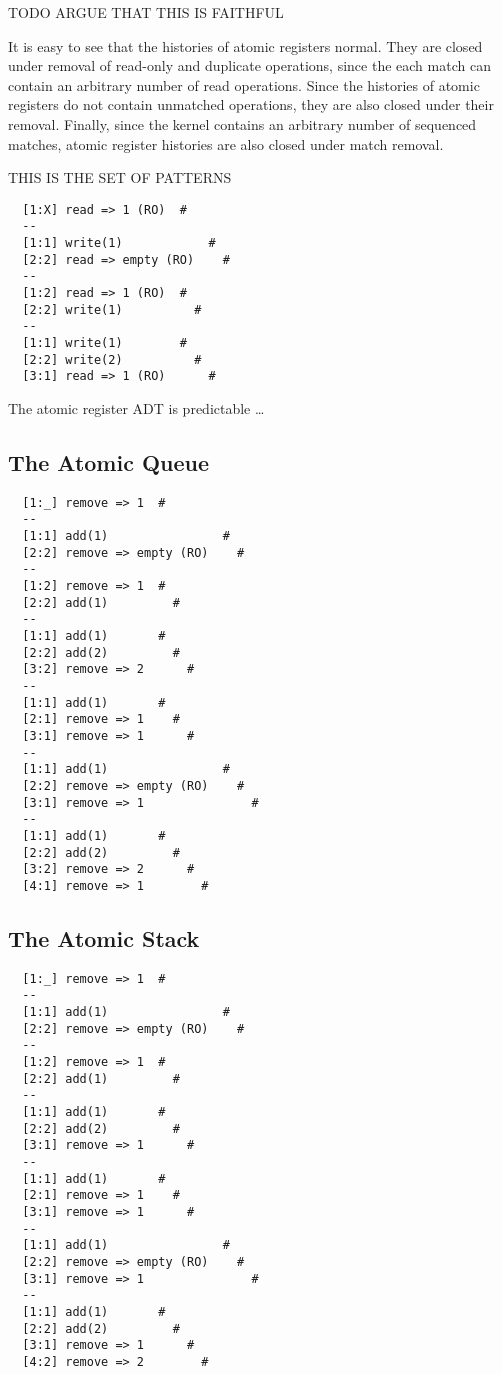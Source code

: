TODO ARGUE THAT THIS IS FAITHFUL

It is easy to see that the histories of atomic registers normal. They are
closed under removal of read-only and duplicate operations, since the each
match can contain an arbitrary number of read operations. Since the histories
of atomic registers do not contain unmatched operations, they are also closed
under their removal. Finally, since the kernel contains an arbitrary number of
sequenced matches, atomic register histories are also closed under match
removal.

THIS IS THE SET OF PATTERNS

\begin{verbatim}
  [1:X] read => 1 (RO)  #
  --
  [1:1] write(1)            #
  [2:2] read => empty (RO)    #
  --
  [1:2] read => 1 (RO)  #
  [2:2] write(1)          #
  --
  [1:1] write(1)        #
  [2:2] write(2)          #
  [3:1] read => 1 (RO)      #
\end{verbatim}

The atomic register ADT is predictable \ldots

\subsection{The Atomic Queue}

\begin{verbatim}
  [1:_] remove => 1  #
  --
  [1:1] add(1)                #
  [2:2] remove => empty (RO)    #
  --
  [1:2] remove => 1  #
  [2:2] add(1)         #
  --
  [1:1] add(1)       #
  [2:2] add(2)         #
  [3:2] remove => 2      #
  --
  [1:1] add(1)       #
  [2:1] remove => 1    #
  [3:1] remove => 1      #
  --
  [1:1] add(1)                #
  [2:2] remove => empty (RO)    #
  [3:1] remove => 1               #
  --
  [1:1] add(1)       #
  [2:2] add(2)         #
  [3:2] remove => 2      #
  [4:1] remove => 1        #
\end{verbatim}

\subsection{The Atomic Stack}

\begin{verbatim}
  [1:_] remove => 1  #
  --
  [1:1] add(1)                #
  [2:2] remove => empty (RO)    #
  --
  [1:2] remove => 1  #
  [2:2] add(1)         #
  --
  [1:1] add(1)       #
  [2:2] add(2)         #
  [3:1] remove => 1      #
  --
  [1:1] add(1)       #
  [2:1] remove => 1    #
  [3:1] remove => 1      #
  --
  [1:1] add(1)                #
  [2:2] remove => empty (RO)    #
  [3:1] remove => 1               #
  --
  [1:1] add(1)       #
  [2:2] add(2)         #
  [3:1] remove => 1      #
  [4:2] remove => 2        #
\end{verbatim}

